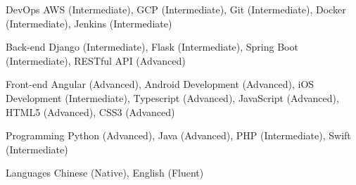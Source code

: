 

\begin{cvskills}

  \cvskill
    {DevOps} %
    {AWS (Intermediate), GCP (Intermediate), Git (Intermediate), Docker (Intermediate), Jenkins (Intermediate)} %

  \cvskill
    {Back-end} %
    {Django (Intermediate), Flask (Intermediate), Spring Boot (Intermediate), RESTful API (Advanced)} %

  \cvskill
    {Front-end} %
    {Angular (Advanced), Android Development (Advanced), iOS Development (Intermediate), Typescript (Advanced), JavaScript (Advanced), HTML5 (Advanced), CSS3 (Advanced)} %

  \cvskill
    {Programming} %
    {Python (Advanced), Java (Advanced), PHP (Intermediate), Swift (Intermediate)} %

  \cvskill
    {Languages} %
    {Chinese (Native), English (Fluent)} %

\end{cvskills}
